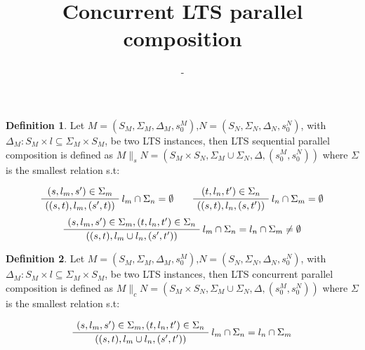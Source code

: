 \documentclass{article}
\title{Concurrent LTS parallel composition} %
\author{-} %
\date{}
\theoremstyle{definition}
\newtheorem{definition}{Definition}[section]
\newcommand{\automaton}[1]{$#1 = (S_{#1}, \Sigma_{#1}, \Delta_{#1}, s_{0}^{#1})$}
\newcommand{\ltsComposition}[3]{$#1 \parallel_{#3} #2 = (S_{#1}\times S_{#2}, \Sigma_{#1} \cup \Sigma_{#2}, \Delta, (s_{0}^{#1},s_{0}^{#2}))$}
\begin{document}
\maketitle

\setcounter{section}{1} %
\setcounter{theorem}{1} %

\begin{definition} 
Let \automaton{M},\automaton{N}, with $\Delta_M : S_M \times l \subseteq \Sigma_M \times S_M$, be two LTS instances, then LTS sequential parallel composition is defined as \ltsComposition{M}{N}{s} where $\Sigma$ is the smallest relation s.t:
\begin{center}
	\begin{equation}
		\AxiomC{$(s, l_m, s') \in \Sigma_m $}\RightLabel{$l_m \cap \Sigma_n = \emptyset$}
		\UnaryInfC{$((s,t),l_m,(s',t))$}
		\DisplayProof
		\quad\quad
		\AxiomC{$(t, l_n, t') \in \Sigma_n $}\RightLabel{$l_n \cap \Sigma_m = \emptyset$}
		\UnaryInfC{$((s,t),l_n,(s,t'))$}
		\DisplayProof
	\end{equation}
	\begin{equation}
		\AxiomC{$(s, l_m, s') \in \Sigma_m,(t, l_n, t') \in \Sigma_n  $}\RightLabel{$l_m \cap \Sigma_n = l_n \cap \Sigma_m \neq \emptyset$}
		\UnaryInfC{$((s,t),l_m \cup l_n,(s',t'))$}
		\DisplayProof
	\end{equation}	
\end{center}
\end{definition}
\begin{definition} 
	Let \automaton{M},\automaton{N}, with $\Delta_M : S_M \times l \subseteq \Sigma_M \times S_M$, be two LTS instances, then LTS concurrent parallel composition is defined as \ltsComposition{M}{N}{c} where $\Sigma$ is the smallest relation s.t:
	\begin{center}
		\begin{equation}
		\AxiomC{$(s, l_m, s') \in \Sigma_m,(t, l_n, t') \in \Sigma_n  $}\RightLabel{$l_m \cap \Sigma_n = l_n \cap \Sigma_m$}
		\UnaryInfC{$((s,t),l_m \cup l_n,(s',t'))$}
		\DisplayProof
		\end{equation}	
	\end{center}
\end{definition}
\end{document}
